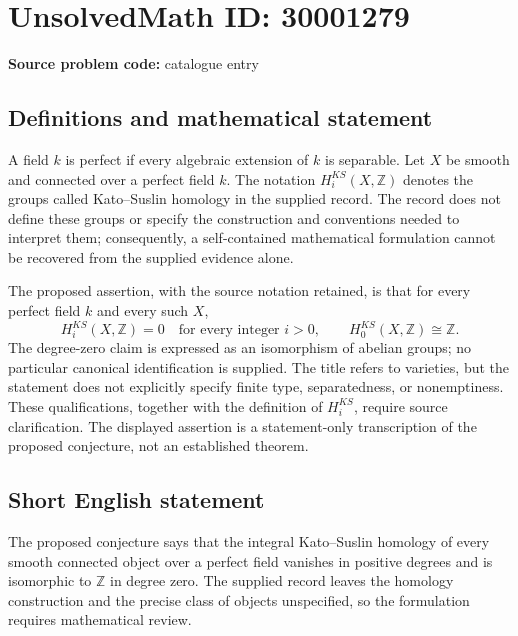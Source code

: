 \documentclass[11pt]{article}
\newcommand{\Z}{\mathbb{Z}}
\begin{document}
\section*{UnsolvedMath ID: 30001279}
\textbf{Source problem code:} catalogue entry
\subsection{Definitions and mathematical statement}
A field \(k\) is perfect if every algebraic extension of \(k\) is separable. Let \(X\) be smooth and connected over a perfect field \(k\). The notation \(H_i^{KS}(X,\Z)\) denotes the groups called Kato--Suslin homology in the supplied record. The record does not define these groups or specify the construction and conventions needed to interpret them; consequently, a self-contained mathematical formulation cannot be recovered from the supplied evidence alone.

The proposed assertion, with the source notation retained, is that for every perfect field \(k\) and every such \(X\),
\[
H_i^{KS}(X,\Z)=0\quad\text{for every integer }i>0,
\qquad H_0^{KS}(X,\Z)\cong\Z.
\]
The degree-zero claim is expressed as an isomorphism of abelian groups; no particular canonical identification is supplied. The title refers to varieties, but the statement does not explicitly specify finite type, separatedness, or nonemptiness. These qualifications, together with the definition of \(H_i^{KS}\), require source clarification. The displayed assertion is a statement-only transcription of the proposed conjecture, not an established theorem.
\subsection{Short English statement}
The proposed conjecture says that the integral Kato--Suslin homology of every smooth connected object over a perfect field vanishes in positive degrees and is isomorphic to \(\Z\) in degree zero. The supplied record leaves the homology construction and the precise class of objects unspecified, so the formulation requires mathematical review.
\end{document}
